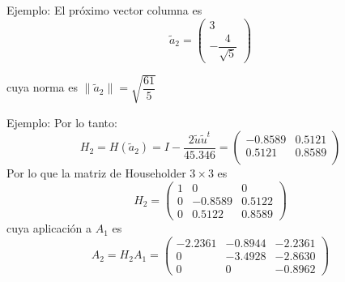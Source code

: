 \documentclass{beamer}
\begin{document}
\begin{frame}{Ejemplo:}
El pr\'oximo vector columna es
$$
\tilde a_2 = \left(\begin{array}{c}
                    3\\
                    -\dfrac{4}{\sqrt{5}}
                   \end{array}\right)
$$

cuya norma es $\|\tilde a_2\|= \sqrt{\dfrac{61}{5}}$ 
\end{frame}
\begin{frame}{Ejemplo:}
Por lo tanto:
$$  
H_2=H(\tilde a_2) = I - \frac{2\tilde u \tilde u^t}{45.346} = 
\left(\begin{array}{cc}
  -0.8589 &  0.5121\\
  0.5121 &  0.8589 \\
  \end{array}\right)
$$
Por lo que la matriz de Householder $3 \times 3$ es
$$
H_2 = \left(\begin{array}{ccc}
      1 & 0 & 0\\
      0 & -0.8589 & 0.5122\\
      0 & 0.5122 & 0.8589
      \end{array}\right)
$$
cuya aplicaci\'on a $A_1$ es
$$
A_2 = H_2A_1 = \left(\begin{array}{ccc}
      -2.2361 & -0.8944 & -2.2361\\
      0 & -3.4928 & -2.8630\\
      0 & 0 & -0.8962
      \end{array}\right)
$$
\end{frame}
\end{document}
